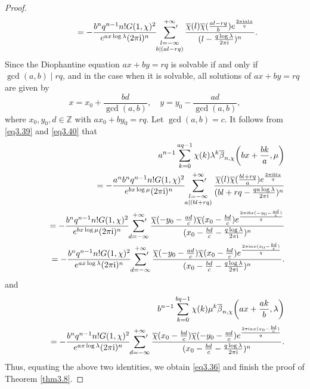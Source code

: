 \documentclass[reqno]{amsart}
\numberwithin{equation}{section}
\begin{document}
\begin{proof}
\begin{eqnarray}
&&\qquad=-\frac{b^{n}q^{n-1}n!G(1,\chi)^{2}}{e^{ax\log\lambda}(2\pi \mathrm{i})^{n}}\sideset{}{'}\sum_{\substack{l=-\infty\\b\mid (al-rq)}}^{+\infty}\frac{\overline{\chi}(l)\overline{\chi}(\frac{al-rq}{b})e^{\frac{2\pi\mathrm{i}alx}{q}}}{(l-\frac{q\log\lambda}{2\pi\mathrm{i}})^{n}}.
\end{eqnarray}
Since the Diophantine equation $ax+by=rq$ is solvable if and only if $\gcd(a,b)\mid rq$, and in the case when it is solvable, all solutions of $ax+by=rq$ are given by
\begin{equation*}
x=x_{0}+\frac{bd}{\gcd(a,b)},\quad y=y_{0}-\frac{ad}{\gcd(a,b)},
\end{equation*}
where $x_{0},y_{0},d\in\mathbb{Z}$ with $ax_{0}+by_{0}=rq$. Let $\gcd(a,b)=c$. It follows from \eqref{eq3.39} and \eqref{eq3.40} that
\begin{eqnarray*}
&&a^{n-1}\sum_{k=0}^{aq-1}\chi(k)\lambda^{k}\overline{\beta}_{n,\chi}\biggl(bx+\frac{bk}{a},\mu\biggl)\nonumber\\
&&\qquad=-\frac{a^{n}b^{n}q^{n-1}n!G(1,\chi)^{2}}{e^{bx\log\mu}(2\pi \mathrm{i})^{n}}\sideset{}{'}\sum_{\substack{l=-\infty\\a\mid (bl+rq)}}^{+\infty}\frac{\overline{\chi}(l)\overline{\chi}(\frac{bl+rq}{a})e^{\frac{2\pi\mathrm{i}blx}{q}}}{(bl+rq-\frac{qa\log\lambda}{2\pi\mathrm{i}})^{n}}\nonumber\\
&&\qquad=-\frac{b^{n}q^{n-1}n!G(1,\chi)^{2}}{e^{bx\log\mu}(2\pi \mathrm{i})^{n}}\sideset{}{'}\sum_{d=-\infty}^{+\infty}\frac{\overline{\chi}(-y_{0}-\frac{ad}{c})\overline{\chi}(x_{0}-\frac{bd}{c})e^{\frac{2\pi\mathrm{i}bx(-y_{0}-\frac{ad}{c})}{q}}}{(x_{0}-\frac{bd}{c}-\frac{q\log\lambda}{2\pi\mathrm{i}})^{n}}\nonumber\\
&&\qquad=-\frac{b^{n}q^{n-1}n!G(1,\chi)^{2}}{e^{ax\log\lambda}(2\pi \mathrm{i})^{n}}\sideset{}{'}\sum_{d=-\infty}^{+\infty}\frac{\overline{\chi}(-y_{0}-\frac{ad}{c})\overline{\chi}(x_{0}-\frac{bd}{c})e^{\frac{2\pi\mathrm{i}ax(x_{0}-\frac{bd}{c})}{q}}}{(x_{0}-\frac{bd}{c}-\frac{q\log\lambda}{2\pi\mathrm{i}})^{n}}.
\end{eqnarray*}
and
\begin{eqnarray*}
&&b^{n-1}\sum_{k=0}^{bq-1}\chi(k)\mu^{k}\overline{\beta}_{n,\chi}\biggl(ax+\frac{ak}{b},\lambda\biggl)\nonumber\\
&&\qquad=-\frac{b^{n}q^{n-1}n!G(1,\chi)^{2}}{e^{ax\log\lambda}(2\pi \mathrm{i})^{n}}\sideset{}{'}\sum_{d=-\infty}^{+\infty}\frac{\overline{\chi}(x_{0}-\frac{bd}{c})\overline{\chi}(-y_{0}-\frac{ad}{c})e^{\frac{2\pi\mathrm{i}ax(x_{0}-\frac{bd}{c})}{q}}}{(x_{0}-\frac{bd}{c}-\frac{q\log\lambda}{2\pi\mathrm{i}})^{n}}.
\end{eqnarray*}
Thus, equating the above two identities, we obtain \eqref{eq3.36} and finish the proof of Theorem \ref{thm3.8}.
\end{proof}
\end{document}
